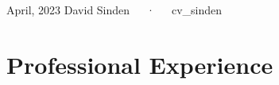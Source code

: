 \documentclass[11pt, a4paper]{awesome-cv}
\begin{document}
\makecvheader

\makecvfooter
  {April, 2023}
    {David Sinden~~~·~~~cv\_sinden}
  {\thepage}



\hypertarget{research-positions}{\section{Professional Experience}\label{professional-experience}}
\end{document}

